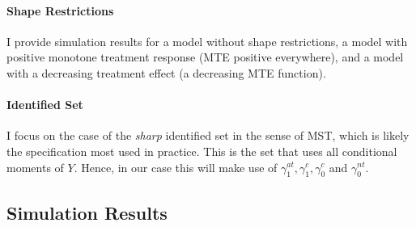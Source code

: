 \documentclass[12pt,a4paper,english]{article} %
\numberwithin{equation}{section}
\theoremstyle{definition}
\theoremstyle{remark}
\theoremstyle{plain}
\begin{document}
\paragraph{Shape Restrictions}
I provide simulation results for a model without shape restrictions, a model with positive monotone treatment response (MTE positive everywhere), and a model with a decreasing treatment effect (a decreasing MTE function).

\paragraph{Identified Set}
I focus on the case of the \textit{sharp} identified set in the sense of MST, which is likely the specification most used in practice.
This is the set that uses all conditional moments of $Y$.
Hence, in our case this will make use of $\gamma_1^{at}, \gamma_1^{c}, \gamma_0^{c}$ and $\gamma_0^{nt}$.

\subsection{Simulation Results}
\end{document}
